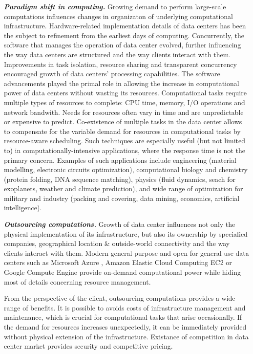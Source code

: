 
\indent\textbf{\emph{Paradigm shift in computing.}}
Growing demand to perform large-scale computations influences changes in organizaton of underlying computational infrastructure.
Hardware-related implementation details of data centers has been the subject to refinement from the earliest days of computing.
Concurrently, the software that manages the operation of data center evolved, further influencing the way data centers are structured and the way clients interact with them.
Improvements in task isolation, resource sharing and transparent concurrency encouraged growth of data centers' processing capabilities.
The software advancements played the primal role in allowing the increase in computational power of data centers without wasting its resources.
Computational tasks require multiple types of resources to complete: CPU time, memory, I/O operations and network bandwith.
Needs for resources often vary in time and are unpredictable or expensive to predict.
Co-existence of multiple tasks in the data center allows to compensate for the variable demand for resources in computational tasks by resource-aware scheduling.
Such techniques are especially useful (but not limited to) in computationally-intensive applications, where the response time is not the primary concern.
Examples of such applications include
engineering (material modelling, electronic circuits optimization),
computational biology and chemistry (protein folding, DNA sequence matching),
physics (fluid dynamics, seach for exoplanets, weather and climate prediction),
and wide range of optimization for military and industry (packing and covering, data mining, economics, artificial intelligence).

\textbf{\emph{Outsourcing computations.}}
Growth of data center influences not only the physical implementation of its infrastructure, but also its ownership by specialied companies, geographical location \& outside-world connectivity and the way clients interact with them.
Modern general-purpose and open for general use data centers such as Microsoft Azure \cite{url-azure}, Amazon Elastic Cloud Computing EC2 \cite{url-amazon-ec2} or Google Compute Engine \cite{url-gce} provide on-demand computational power while hiding most of details concerning resource management.

From the perspective of the client, outsourcing computations provides a wide range of benefits.
It is possible to avoids costs of infrastructure management and maintenance, which is crucial for computational tasks that arise occasionally.
If the demand for resources increases unexpectedly, it can be immediately provided without physical extension of the infrastructure.
Existance of competition in data center market provides security and competitive pricing.


